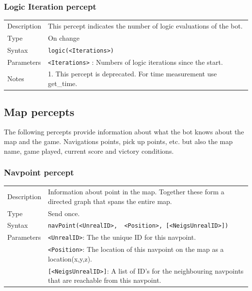 \documentclass[11pt,a4paper]{article}
\begin{document}
\subsubsection*{Logic Iteration percept}
\begin{small}
\begin{tabular}{p{2cm}p{9cm}}
Description & This percept indicates the number of logic evaluations of the bot. \\
Type & On change\\
Syntax & \verb|logic(<Iterations>)|\\
Parameters 
	&  \verb|<Iterations>| : Numbers of logic iterations since the start. \\
Notes & 1.	This percept is deprecated. For time measurement use get\_time. \\
\end{tabular}
\end{small}

\subsection{Map percepts}
The following percepts provide information about what the bot knows about the map and the game. Navigations points, pick up points, etc. but also the map name, game played, current score and victory conditions.

\subsubsection*{Navpoint percept}
\begin{small}
\begin{tabular}{p{2cm}p{9cm}}
Description & Information about point in the map. Together these form a directed graph that spans the entire map.\\
Type & Send once.\\
Syntax & \verb|navPoint(<UnrealID>,  <Position>, [<NeigsUnrealID>])|\\
Parameters & \verb|<UnrealID>|: The the unique ID for this navpoint.\\
& \verb|<Position>|: The location of this navpoint on the map as a location(x,y,z).\\
& \verb|[<NeigsUnrealID>]|: A list of ID's for the neighbouring navpoints that are reachable from this navpoint.
\end{tabular}
\end{small}
\end{document}
